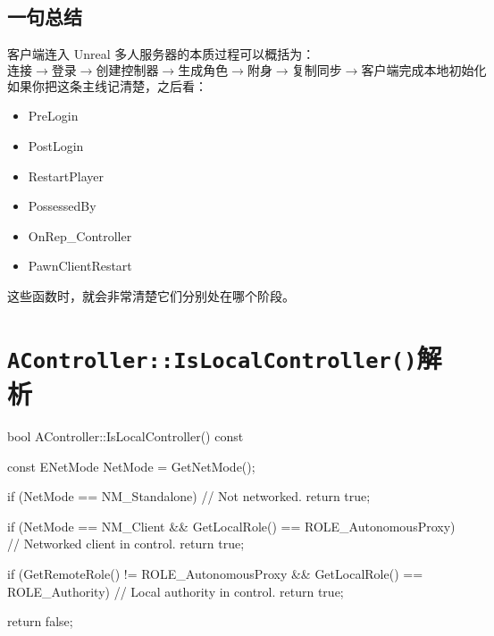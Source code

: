 \subsection{一句总结}
客户端连入 Unreal 多人服务器的本质过程可以概括为：
\[ \text{连接} \rightarrow \text{登录} \rightarrow \text{创建控制器} \rightarrow \text{生成角色} \rightarrow \text{附身} \rightarrow \text{复制同步} \rightarrow \text{客户端完成本地初始化} \]
如果你把这条主线记清楚，之后看：
\begin{itemize}
	\item PreLogin 
	\item PostLogin 
	\item RestartPlayer 
	\item PossessedBy 
	\item OnRep\_Controller 
	\item PawnClientRestart 
\end{itemize}
这些函数时，就会非常清楚它们分别处在哪个阶段。

\section{\texttt{AController::IsLocalController()}解析}
\begin{code}[caption={AController::IsLocalController()}]
	bool AController::IsLocalController() const
	{
		const ENetMode NetMode = GetNetMode();
		
		if (NetMode == NM_Standalone)
		{
			// Not networked.
			return true;
		}
		
		if (NetMode == NM_Client && GetLocalRole() == ROLE_AutonomousProxy)
		{
			// Networked client in control.
			return true;
		}
		
		if (GetRemoteRole() != ROLE_AutonomousProxy && GetLocalRole() == ROLE_Authority)
		{
			// Local authority in control.
			return true;
		}
		
		return false;
	}
\end{code}


